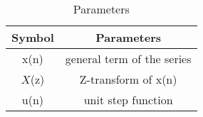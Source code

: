 
\begin{table}[h]
  \centering
  \begin{tabular}{|c|c|}
    \hline
    	\textbf{Symbol} & \textbf{Parameters} \\
    \hline
	  x(n) & general term of the series \\
    \hline
	  $X$(z) & Z-transform of x(n) \\
    \hline 
	  u(n) & unit step function \\
    \hline
  \end{tabular}
  \vspace{0.3cm}
  \caption{Parameters}
  \label{tab:parameters}
\end{table}

